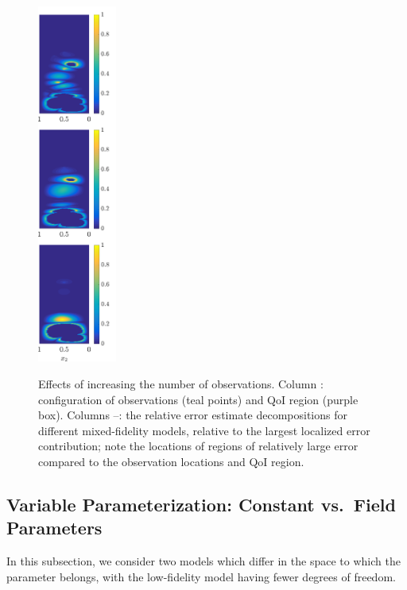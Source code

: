 \documentclass[review,sort&compress]{elsarticle}
\begin{document}
\begin{figure}[htbp]
{  \includegraphics[width=0.23\textwidth]{vs_data/vs_data_err2_barnorm.png}
  \label{subfig:obsMFlast2}
}
  \caption{Effects of increasing the number of observations. Column \protect{}: configuration of observations (teal points) and QoI region (purple box). Columns \protect{}--\protect{}: the relative error estimate decompositions for different mixed-fidelity models, relative to the largest localized error contribution; note the locations of regions of relatively large error compared to the observation locations and QoI region.}
  \label{fig:dataStudy}
\end{figure}

\subsection{Variable Parameterization: Constant vs.\ Field Parameters} \label{sec:constvfield}

In this subsection, we consider two models which differ in the space to which the parameter belongs, with the low-fidelity model having fewer degrees of freedom. 
\end{document}
